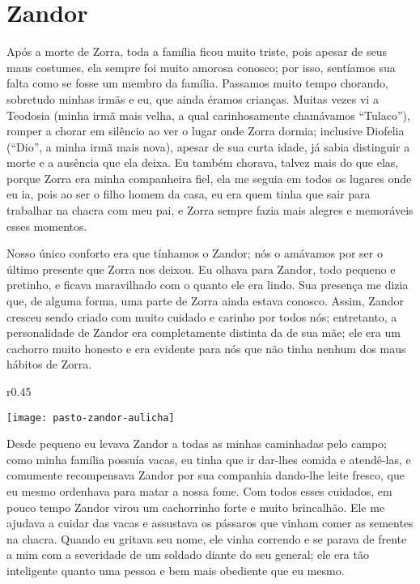 \cleardoublepage
\newpage
\ifdefined\EnableIncludeImages
\fi
\chapter{Zandor}

Após a morte de Zorra, toda a família ficou muito triste, pois apesar de seus maus costumes, ela sempre foi muito amorosa conosco; por isso, sentíamos sua falta como se fosse um membro da família. 
Passamos muito tempo chorando, sobretudo minhas irmãs e eu, que ainda éramos crianças. 
Muitas vezes vi a Teodosia (minha irmã mais velha, a qual carinhosamente chamávamos ``Tulaco''), romper a chorar em silêncio ao ver o lugar onde Zorra dormia; inclusive Diofelia  (``Dio'', a minha irmã mais nova), apesar de sua curta idade, já sabia distinguir a morte e a ausência que ela deixa. 
Eu também chorava, talvez mais do que elas, porque Zorra era minha companheira fiel, ela me seguia em todos os lugares onde eu ia, pois ao ser o filho homem da casa, eu era quem tinha que sair para trabalhar na chacra com meu pai, e Zorra sempre fazia mais alegres e memoráveis esses momentos.

Nosso único conforto era que tínhamos o Zandor; nós o amávamos por ser o último presente que Zorra nos deixou.
Eu olhava para Zandor, todo pequeno e pretinho, e ficava maravilhado com o quanto ele era lindo. Sua presença me dizia que, de alguma forma, uma parte de Zorra ainda estava conosco. 
Assim, Zandor cresceu sendo criado com muito cuidado e carinho por todos nós;
entretanto, a personalidade de Zandor era completamente distinta da de sua mãe; ele era um cachorro muito honesto e era evidente para nós que não tinha nenhum dos maus hábitos de Zorra. 
\ifdefined\EnableIncludeImages
\begin{wrapfigure}{r}{0.45\textwidth}
  \begin{center}
  \vspace{-20pt}
    \texttt{[image: pasto-zandor-aulicha]}
  \end{center}
  \vspace{-20pt}
\end{wrapfigure}
\fi
Desde pequeno eu levava Zandor a todas as minhas caminhadas pelo campo; como minha família possuía vacas, eu tinha que ir dar-lhes comida e atendê-las, e comumente recompensava Zandor por sua companhia dando-lhe leite fresco, que eu mesmo ordenhava para matar a nossa fome. 
Com todos esses cuidados, em pouco tempo Zandor virou um cachorrinho forte e muito brincalhão.
Ele me ajudava a cuidar das vacas e assustava os pássaros que vinham comer as sementes na chacra. 
Quando eu gritava seu nome, ele vinha correndo e se parava de frente a mim com a severidade de um soldado diante do seu general; 
ele era tão inteligente quanto uma pessoa e bem mais obediente que eu mesmo.


